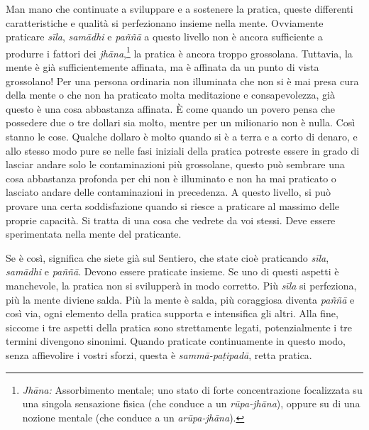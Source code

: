 Man mano che continuate a sviluppare e a sostenere la pratica, queste
differenti caratteristiche e qualità si perfezionano insieme nella
mente. Ovviamente praticare \emph{sīla}, \emph{samādhi} e \emph{paññā} a
questo livello non è ancora sufficiente a produrre i fattori dei
\emph{jhāna},\footnote{\emph{Jhāna:} Assorbimento mentale; uno stato di
  forte concentrazione focalizzata su una singola sensazione fisica (che
  conduce a un \emph{rūpa-jhāna}), oppure su di una nozione mentale (che
  conduce a un \emph{arūpa-jhāna}).} la pratica è ancora troppo
grossolana. Tuttavia, la mente è già sufficientemente affinata, ma è
affinata da un punto di vista grossolano! Per una persona ordinaria non
illuminata che non si è mai presa cura della mente o che non ha
praticato molta meditazione e consapevolezza, già questo è una cosa
abbastanza affinata. È come quando un povero pensa che possedere due o
tre dollari sia molto, mentre per un milionario non è nulla. Così stanno
le cose. Qualche dollaro è molto quando si è a terra e a corto di
denaro, e allo stesso modo pure se nelle fasi iniziali della pratica
potreste essere in grado di lasciar andare solo le contaminazioni più
grossolane, questo può sembrare una cosa abbastanza profonda per chi non
è illuminato e non ha mai praticato o lasciato andare delle
contaminazioni in precedenza. A questo livello, si può provare una certa
soddisfazione quando si riesce a praticare al massimo delle proprie
capacità. Si tratta di una cosa che vedrete da voi stessi. Deve essere
sperimentata nella mente del praticante.

Se è così, significa che siete già sul Sentiero, che state cioè
praticando \emph{sīla}, \emph{samādhi} e \emph{paññā}. Devono essere
praticate insieme. Se uno di questi aspetti è manchevole, la pratica non
si svilupperà in modo corretto. Più \emph{sīla} si perfeziona, più la
mente diviene salda. Più la mente è salda, più coraggiosa diventa
\emph{paññā} e così via, ogni elemento della pratica supporta e
intensifica gli altri. Alla fine, siccome i tre aspetti della pratica
sono strettamente legati, potenzialmente i tre termini divengono
sinonimi. Quando praticate continuamente in questo modo, senza
affievolire i vostri sforzi, questa è \emph{sammā-paṭipadā}, retta
pratica.

